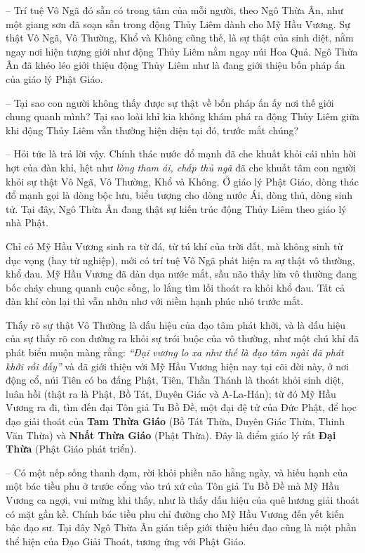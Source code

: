 -- Trí tuệ Vô Ngã đó sẵn có trong tâm của mỗi người, theo Ngô Thừa Ân, như một giang sơn đã soạn sẵn trong động Thủy Liêm dành cho Mỹ Hầu Vương. Sự thật Vô Ngã, Vô Thường, Khổ và Không cũng thế, là sự thật của sinh diệt, nằm ngay nơi hiện tượng giới như động Thủy Liêm nằm ngay núi Hoa Quả. Ngô Thừa Ân đã khéo léo giới thiệu động Thủy Liêm như là đang giới thiệu bốn pháp ấn của giáo lý Phật Giáo.

-- Tại sao con người không thấy được sự thật về bốn pháp ấn ấy nơi thế giới chung quanh mình? Tại sao loài khỉ kia không khám phá ra động Thủy Liêm giữa khi động Thủy Liêm vẫn thường hiện diện tại đó, trước mắt chúng?

-- Hỏi tức là trả lời vậy. Chính thác nước đổ mạnh đã che khuất khỏi cái nhìn hời hợt của đàn khỉ, hệt như \emph{lòng tham ái, chấp thủ ngã} đã che khuất tâm con người khỏi sự thật Vô Ngã, Vô Thường, Khổ và Không. Ở giáo lý Phật Giáo, dòng thác đổ mạnh gọi là dòng bộc lưu, biểu tượng cho dòng nước Ái, dòng thủ, dòng sinh tử. Tại đây, Ngô Thừa Ân đang thật sự kiến trúc động Thủy Liêm theo giáo lý nhà Phật.

Chỉ có Mỹ Hầu Vương sinh ra từ đá, từ tú khí của trời đất, mà không sinh từ dục vọng (hay từ nghiệp), mới có trí tuệ Vô Ngã phát hiện ra sự thật vô thường, khổ đau. Mỹ Hầu Vương đã dàn dụa nước mắt, sầu não thấy lửa vô thường đang bốc cháy chung quanh cuộc sống, lo lắng tìm lối thoát ra khỏi khổ đau. Tất cả đàn khỉ còn lại thì vẫn nhởn nhơ với niềm hạnh phúc nhỏ trước mắt.

Thấy rõ sự thật Vô Thường là dấu hiệu của đạo tâm phát khởi, và là dấu hiệu của sự thấy rõ con đường ra khỏi sự trói buộc của vô thường, như một chú khỉ đã phát biểu muộn màng rằng: \emph{``Đại vương lo xa như thế là đạo tâm ngài đã phát khởi rồi đấy''} và đã giới thiệu với Mỹ Hầu Vương hiện nay tại cõi đời này, ở nơi động cổ, núi Tiên có ba đấng Phật, Tiên, Thần Thánh là thoát khỏi sinh diệt, luân hồi (thật ra là Phật, Bồ Tát, Duyên Giác và A-La-Hán); từ đó Mỹ Hầu Vương ra đi, tìm đến đại Tôn giả Tu Bồ Đề, một đại đệ tử của Đức Phật, để học đạo giải thoát của {\bf Tam Thừa Giáo} (Bồ Tát Thừa, Duyên Giác Thừa, Thinh Văn Thừa) và {\bf Nhất Thừa Giáo} (Phật Thừa). Đây là điểm giáo lý rất {\bf Đại Thừa} (Phật Giáo phát triển).

-- Có một nếp sống thanh đạm, rời khỏi phiền não hằng ngày, và hiếu hạnh của một bác tiều phu ở trước cổng vào trú xứ của Tôn giả Tu Bồ Đề mà Mỹ Hầu Vương ca ngợi, vui mừng khi thấy, như là thấy dấu hiệu của quê hương giải thoát có mặt gần kề. Chính bác tiều phu chỉ đường cho Mỹ Hầu Vương đến yết kiến bậc đạo sư. Tại đây Ngô Thừa Ân gián tiếp giới thiệu hiếu đạo cũng là một phần thể hiện của Đạo Giải Thoát, tương ứng với Phật Giáo.

